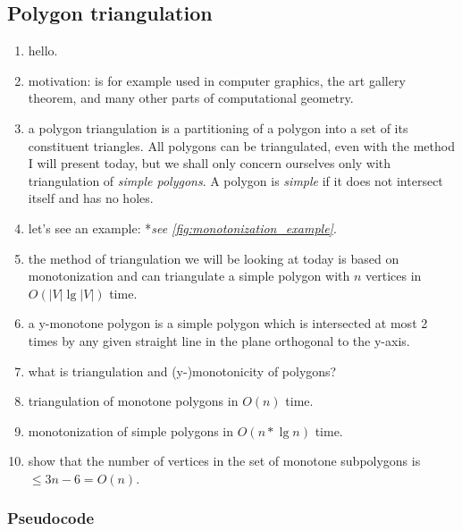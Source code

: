 

\newpage
\subsection{Polygon triangulation}

\begin{enumerate}
  \item hello.

  \item motivation: is for example used in computer graphics, the art gallery
    theorem, and many other parts of computational geometry.

  \item a polygon triangulation is a partitioning of a polygon into a set of its
    constituent triangles. All polygons can be triangulated, even with the
    method I will present today, but we shall only concern ourselves only with
    triangulation of \emph{simple polygons}. A polygon is \emph{simple} if it
    does not intersect itself and has no holes.

  \item let's see an example: *\emph{see \cref{fig:monotonization_example}}.

  \item the method of triangulation we will be looking at today is based on
    monotonization and can triangulate a simple polygon with $n$ vertices in
    $O(|V| \lg |V|)$ time.

  \item a y-monotone polygon is a simple polygon which is intersected at most 2
    times by any given straight line in the plane orthogonal to the y-axis.

  \item what is triangulation and (y-)monotonicity of polygons?

  \item triangulation of monotone polygons in $O(n)$ time.

  \item monotonization of simple polygons in $O(n * \lg n)$ time.

  \item show that the number of vertices in the set of monotone subpolygons is
    $\leq 3n - 6 = O(n)$.

\end{enumerate}




\newpage
\subsubsection{Pseudocode}


